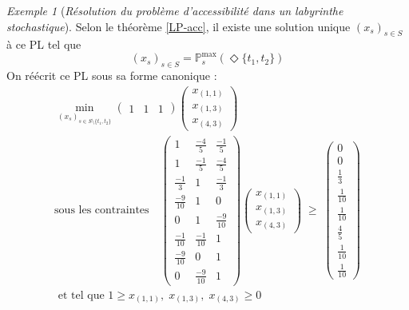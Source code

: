 \documentclass[12pt,a4paper]{report}
\theoremstyle{definition}%
\theoremstyle{remark}
\newtheorem{example}{Exemple}[chapter]
\newcommand{\pr}{\mathbb{P}}
\begin{document}
\begin{example}[\textit{Résolution du problème d'accessibilité dans un labyrinthe stochastique}]
Selon le théorème \ref{LP-acc}, il existe une solution unique $(x_s)_{s \in S}$
à ce PL tel que \[(x_s)_{s \in S} = \pr^{\max}_s (\Diamond \{t_1, t_2\})\]
On réécrit ce PL sous sa forme canonique :
\begin{gather*}
	\min_{(x_s)_{s \in S \setminus \{ t_1, t_2\} }}
		\begin{pmatrix}
			1 & 1 & 1
		\end{pmatrix}
		\begin{pmatrix}
			x_{(1, 1)} \\[0.3em]
			x_{(1, 3)} \\[0.3em]
			x_{(4, 3)}
		\end{pmatrix}
		\\
		\text{sous les contraintes} \quad
		\begin{pmatrix}
			1 & \frac{-4}{5} & \frac{-1}{5} \\[0.3em]
			1 & \frac{-1}{5} & \frac{-4}{5} \\[0.3em]
			\frac{-1}{3} & 1 & \frac{-1}{3} \\[0.3em]
			\frac{-9}{10} & 1 & 0 \\[0.3em]
			0 & 1 & \frac{-9}{10} \\[0.3em]
			\frac{-1}{10} & \frac{-1}{10} & 1 \\[0.3em]
			\frac{-9}{10} & 0 & 1 \\[0.3em]
			0 & \frac{-9}{10} & 1
		\end{pmatrix}
		\begin{pmatrix}
			x_{(1, 1)} \\[0.3em]
			x_{(1, 3)} \\[0.3em]
			x_{(4, 3)}
		\end{pmatrix}
		\; \geq \;
		\begin{pmatrix}
			0 \\[0.3em]
			0 \\[0.3em]
			\frac{1}{3} \\[0.3em]
			\frac{1}{10} \\[0.3em]
			\frac{1}{10} \\[0.3em]
			\frac{4}{5} \\[0.3em]
			\frac{1}{10} \\[0.3em]
			\frac{1}{10}
		\end{pmatrix} \\[0.3em]
		\text{ et tel que } 1 \geq x_{(1, 1)}, \; x_{(1, 3)}, \; x_{(4, 3)} \geq 0

\end{gather*}
\end{example}
\end{document}
